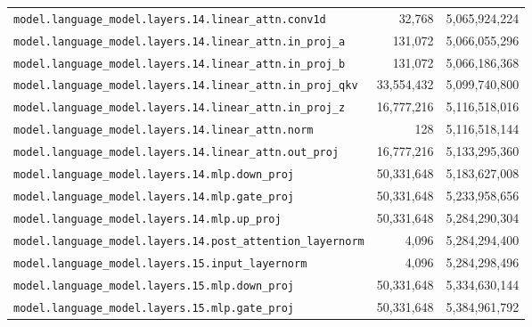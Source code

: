 \documentclass[10pt,a4paper]{article}
\theoremstyle{definition}
\begin{document}
\begin{appendices}
\begin{longtable}{p{9.5cm}rr}
\texttt{model.\allowbreak{}language\_model.\allowbreak{}layers.\allowbreak{}14.\allowbreak{}linear\_attn.\allowbreak{}conv1d} & 32,768 & 5,065,924,224 \\
\texttt{model.\allowbreak{}language\_model.\allowbreak{}layers.\allowbreak{}14.\allowbreak{}linear\_attn.\allowbreak{}in\_proj\_a} & 131,072 & 5,066,055,296 \\
\texttt{model.\allowbreak{}language\_model.\allowbreak{}layers.\allowbreak{}14.\allowbreak{}linear\_attn.\allowbreak{}in\_proj\_b} & 131,072 & 5,066,186,368 \\
\texttt{model.\allowbreak{}language\_model.\allowbreak{}layers.\allowbreak{}14.\allowbreak{}linear\_attn.\allowbreak{}in\_proj\_qkv} & 33,554,432 & 5,099,740,800 \\
\texttt{model.\allowbreak{}language\_model.\allowbreak{}layers.\allowbreak{}14.\allowbreak{}linear\_attn.\allowbreak{}in\_proj\_z} & 16,777,216 & 5,116,518,016 \\
\texttt{model.\allowbreak{}language\_model.\allowbreak{}layers.\allowbreak{}14.\allowbreak{}linear\_attn.\allowbreak{}norm} & 128 & 5,116,518,144 \\
\texttt{model.\allowbreak{}language\_model.\allowbreak{}layers.\allowbreak{}14.\allowbreak{}linear\_attn.\allowbreak{}out\_proj} & 16,777,216 & 5,133,295,360 \\
\texttt{model.\allowbreak{}language\_model.\allowbreak{}layers.\allowbreak{}14.\allowbreak{}mlp.\allowbreak{}down\_proj} & 50,331,648 & 5,183,627,008 \\
\texttt{model.\allowbreak{}language\_model.\allowbreak{}layers.\allowbreak{}14.\allowbreak{}mlp.\allowbreak{}gate\_proj} & 50,331,648 & 5,233,958,656 \\
\texttt{model.\allowbreak{}language\_model.\allowbreak{}layers.\allowbreak{}14.\allowbreak{}mlp.\allowbreak{}up\_proj} & 50,331,648 & 5,284,290,304 \\
\texttt{model.\allowbreak{}language\_model.\allowbreak{}layers.\allowbreak{}14.\allowbreak{}post\_attention\_layernorm} & 4,096 & 5,284,294,400 \\
\texttt{model.\allowbreak{}language\_model.\allowbreak{}layers.\allowbreak{}15.\allowbreak{}input\_layernorm} & 4,096 & 5,284,298,496 \\
\texttt{model.\allowbreak{}language\_model.\allowbreak{}layers.\allowbreak{}15.\allowbreak{}mlp.\allowbreak{}down\_proj} & 50,331,648 & 5,334,630,144 \\
\texttt{model.\allowbreak{}language\_model.\allowbreak{}layers.\allowbreak{}15.\allowbreak{}mlp.\allowbreak{}gate\_proj} & 50,331,648 & 5,384,961,792 \\

\end{longtable}
\end{appendices}
\end{document}
